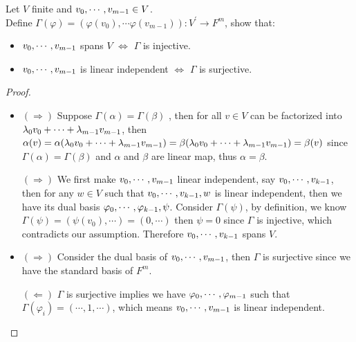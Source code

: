 \documentclass[../main.tex]{subfiles}
\begin{document}
\setcounter{exercise}{23}
\begin{exercise}
  Let $V$ finite and $\join{v}{m - 1} \in V$. \\
  Define $\Gamma(\varphi) = (\varphi(v_0), \cdots \varphi(v_{m - 1})) : V^\prime \rightarrow F^m$,
  show that:
  \begin{itemize}
    \item $\join{v}{m - 1}$ spans $V$ $\iff$ $\Gamma$ is injective.
    \item $\join{v}{m - 1}$ is linear independent $\iff$ $\Gamma$ is surjective.
  \end{itemize}
\end{exercise}
\begin{proof}
  ~
  \begin{itemize}
    \item $(\Rightarrow)$ Suppose $\Gamma(\alpha) = \Gamma(\beta)$ , then for all $v \in V$ can be factorized into $\joinp[+]{\lambda}{v}{m - 1}$,
          then $\alpha(v) = \alpha(\joinp[+]{\lambda}{v}{m - 1}) = \beta(\joinp[+]{\lambda}{v}{m - 1}) = \beta(v)$
          since $\Gamma(\alpha) = \Gamma(\beta)$ and $\alpha$ and $\beta$ are linear map,
          thus $\alpha = \beta$.

          $(\Rightarrow)$ We first make $\join{v}{m - 1}$ linear independent, say $\join{v}{k - 1}$,
          then for any $w \in V$ such that $\join{v}{k - 1}, w$ is linear independent,
          then we have its dual basis $\join{\varphi}{k - 1}, \psi$.
          Consider $\Gamma(\psi)$, by definition, we know $\Gamma(\psi) = (\psi(v_0), \cdots) = (0, \cdots)$
          then $\psi = 0$ since $\Gamma$ is injective, which contradicts our assumption.
          Therefore $\join{v}{k - 1}$ spans $V$.
    \item $(\Rightarrow)$ Consider the dual basis of $\join{v}{m - 1}$, then $\Gamma$ is surjective
          since we have the standard basis of $F^m$.

          $(\Leftarrow)$ $\Gamma$ is surjective implies we have $\join{\varphi}{m - 1}$
          such that $\Gamma(\varphi_i) = (\cdots, 1, \cdots)$,
          which means $\join{v}{m - 1}$ is linear independent.
  \end{itemize}
\end{proof}
\end{document}
